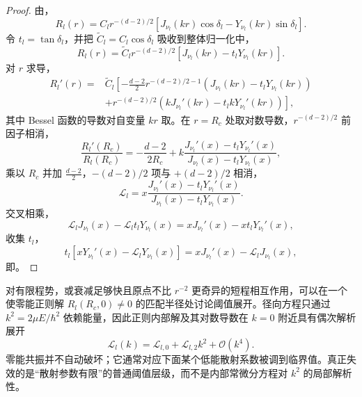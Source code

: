 \begin{proof}
由，
\begin{equation*}
 R_l(r)=C_l r^{-(d-2)/2}
 \left[J_{\nu_l}(kr)\cos\delta_l-Y_{\nu_l}(kr)\sin\delta_l\right].
\end{equation*}
令 $t_l=\tan\delta_l$，并把 $\widetilde C_l=C_l\cos\delta_l$ 吸收到整体归一化中，
\begin{equation*}
 R_l(r)=\widetilde C_l r^{-(d-2)/2}
 \left[J_{\nu_l}(kr)-t_lY_{\nu_l}(kr)\right].
\end{equation*}
对 $r$ 求导，
\begin{align*}
 R_l'(r)
 ={}&\widetilde C_l\!\left[
 -\frac{d-2}{2}r^{-(d-2)/2-1}
 \left(J_{\nu_l}(kr)-t_lY_{\nu_l}(kr)\right)\right.\\
 &\left.+r^{-(d-2)/2}
 \left(kJ_{\nu_l}'(kr)-t_l kY_{\nu_l}'(kr)\right)
 \right],
\end{align*}
其中 Bessel 函数的导数对自变量 $kr$ 取。在 $r=R_c$ 处取对数导数，$r^{-(d-2)/2}$ 前因子相消，
\begin{equation*}
 \frac{R_l'(R_c)}{R_l(R_c)}
 =-\frac{d-2}{2R_c}
 +k\frac{J_{\nu_l}'(x)-t_lY_{\nu_l}'(x)}
 {J_{\nu_l}(x)-t_lY_{\nu_l}(x)},
\end{equation*}
乘以 $R_c$ 并加 $\frac{d-2}{2}$，$-(d-2)/2$ 项与 $+(d-2)/2$ 相消，
\begin{equation*}
 \mathcal L_l
 =x\frac{J_{\nu_l}'(x)-t_lY_{\nu_l}'(x)}
 {J_{\nu_l}(x)-t_lY_{\nu_l}(x)}.
\end{equation*}
交叉相乘，
\begin{equation*}
 \mathcal L_l J_{\nu_l}(x)-\mathcal L_l t_lY_{\nu_l}(x)
 =xJ_{\nu_l}'(x)-x t_lY_{\nu_l}'(x),
\end{equation*}
收集 $t_l$，
\begin{equation*}
 t_l\!\left[xY_{\nu_l}'(x)-\mathcal L_lY_{\nu_l}(x)\right]
 =xJ_{\nu_l}'(x)-\mathcal L_lJ_{\nu_l}(x),
\end{equation*}
即。
\end{proof}

对有限程势，或衰减足够快且原点不比 $r^{-2}$ 更奇异的短程相互作用，可以在一个使零能正则解 $R_l(R_c,0)\neq0$ 的匹配半径处讨论阈值展开。径向方程只通过 $k^2=2\mu E/\hbar^2$ 依赖能量，因此正则内部解及其对数导数在 $k=0$ 附近具有偶次解析展开
\begin{equation}
\mathcal L_l(k)=\mathcal L_{l,0}+\mathcal L_{l,2}k^2+\mathcal O(k^4).
\label{eq:phys-hdqm-logderivative-threshold}
\end{equation}
零能共振并不自动破坏；它通常对应下面某个低能散射系数被调到临界值。真正失效的是“散射参数有限”的普通阈值层级，而不是内部常微分方程对 $k^2$ 的局部解析性。


